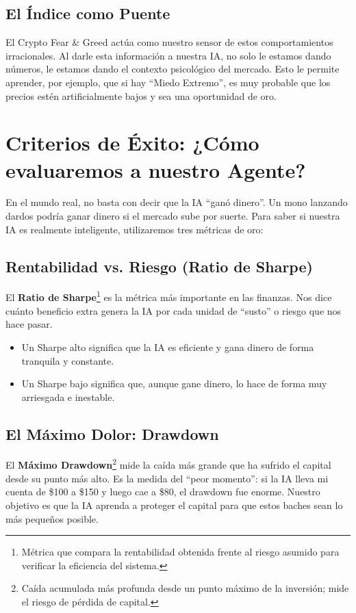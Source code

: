 \documentclass[12pt,a4paper]{article}
\begin{document}
\subsection{El Índice como Puente}

El Crypto Fear \& Greed actúa como nuestro sensor de estos comportamientos irracionales. Al darle esta información a nuestra IA, no solo le estamos dando números, le estamos dando el contexto psicológico del mercado. Esto le permite aprender, por ejemplo, que si hay ``Miedo Extremo'', es muy probable que los precios estén artificialmente bajos y sea una oportunidad de oro.

\section{Criterios de Éxito: ¿Cómo evaluaremos a nuestro Agente?}

En el mundo real, no basta con decir que la IA ``ganó dinero''. Un mono lanzando dardos podría ganar dinero si el mercado sube por suerte. Para saber si nuestra IA es realmente inteligente, utilizaremos tres métricas de oro:

\subsection{Rentabilidad vs. Riesgo (Ratio de Sharpe)}

El \textbf{Ratio de Sharpe}\footnote{Métrica que compara la rentabilidad obtenida frente al riesgo asumido para verificar la eficiencia del sistema.} es la métrica más importante en las finanzas. Nos dice cuánto beneficio extra genera la IA por cada unidad de ``susto'' o riesgo que nos hace pasar. 
\begin{itemize}
    \item Un Sharpe alto significa que la IA es eficiente y gana dinero de forma tranquila y constante.
    \item Un Sharpe bajo significa que, aunque gane dinero, lo hace de forma muy arriesgada e inestable.
\end{itemize}

\subsection{El Máximo Dolor: Drawdown}

El \textbf{Máximo Drawdown}\footnote{Caída acumulada más profunda desde un punto máximo de la inversión; mide el riesgo de pérdida de capital.} mide la caída más grande que ha sufrido el capital desde su punto más alto. Es la medida del ``peor momento'': si la IA lleva mi cuenta de \$100 a \$150 y luego cae a \$80, el drawdown fue enorme. Nuestro objetivo es que la IA aprenda a proteger el capital para que estos baches sean lo más pequeños posible.
\end{document}
